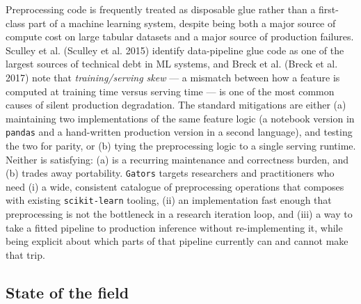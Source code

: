 \documentclass[
]{article}
\begin{document}
Preprocessing code is frequently treated as disposable glue rather than
a first-class part of a machine learning system, despite being both a
major source of compute cost on large tabular datasets and a major
source of production failures. Sculley et al. (Sculley et al. 2015)
identify data-pipeline glue code as one of the largest sources of
technical debt in ML systems, and Breck et al. (Breck et al. 2017) note
that \emph{training/serving skew} --- a mismatch between how a feature
is computed at training time versus serving time --- is one of the most
common causes of silent production degradation. The standard mitigations
are either (a) maintaining two implementations of the same feature logic
(a notebook version in \texttt{pandas} and a hand-written production
version in a second language), and testing the two for parity, or (b)
tying the preprocessing logic to a single serving runtime. Neither is
satisfying: (a) is a recurring maintenance and correctness burden, and
(b) trades away portability. \texttt{Gators} targets researchers and
practitioners who need (i) a wide, consistent catalogue of preprocessing
operations that composes with existing \texttt{scikit-learn} tooling,
(ii) an implementation fast enough that preprocessing is not the
bottleneck in a research iteration loop, and (iii) a way to take a
fitted pipeline to production inference without re-implementing it,
while being explicit about which parts of that pipeline currently can
and cannot make that trip.

\subsection{State of the field}\label{state-of-the-field}
\end{document}
